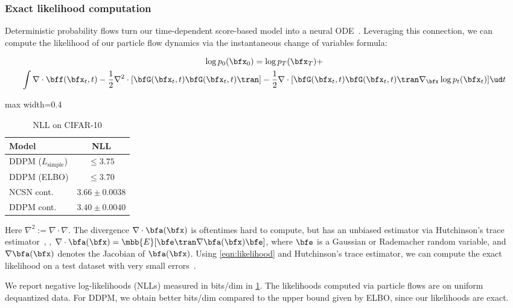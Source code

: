 \subsubsection{Exact likelihood computation}
Deterministic probability flows turn our time-dependent score-based model into a neural ODE~\citep{chen2018neural}. Leveraging this connection, we can compute the likelihood of our particle flow dynamics via the instantaneous change of variables formula:
\begin{theorem}
\begin{multline}
\log p_0(\bfx_0) = \log p_T(\bfx_T) + \\
\int \nabla \cdot \bff(\bfx_t, t) - \frac{1}{2} \nabla^2 \cdot [\bfG(\bfx_t, t)\bfG(\bfx_t, t)\tran] - \frac{1}{2} \nabla \cdot [\bfG(\bfx_t, t)\bfG(\bfx_t, t)\tran \nabla_\bfx \log p_t(\bfx_t)]  \ud t
\end{multline}\label{eqn:likelihood}
\end{theorem}
\begin{table}
\vspace{-2em}
\centering
\caption{NLL on CIFAR-10}\label{tab:bpd}
\begin{adjustbox}{max width=0.4\textwidth}
    \begin{tabular}{l c}
    \toprule
    Model & NLL \\
    \midrule
    DDPM ($L_{\text{simple}}$) & $\leq 3.75$\\
    DDPM (ELBO) & $\leq 3.70$\\
    \midrule
    NCSN cont. & $3.66 \pm 0.0038$\\
    DDPM cont. & $3.40 \pm 0.0040$\\
    \bottomrule
    \end{tabular}
\end{adjustbox}
\end{table}
Here $\nabla^2 := \nabla \cdot \nabla$. The divergence $\nabla \cdot \bfa(\bfx)$ is oftentimes hard to compute, but has an unbiased estimator via Hutchinson's trace estimator~\citep{hutchinson1990stochastic}, \ie, $\nabla \cdot \bfa(\bfx) = \mbb{E}[\bfe \tran \nabla \bfa(\bfx) \bfe]$, where $\bfe$ is a Gaussian or Rademacher random variable, and $\nabla \bfa(\bfx)$ denotes the Jacobian of $\bfa(\bfx)$. Using \cref{eqn:likelihood} and Hutchinson's trace estimator, we can compute the exact likelihood on a test dataset with very small errors~\citep{grathwohl2019scalable}.

We report negative log-likelihoods (NLLs) measured in bits/dim in \cref{tab:bpd}. The likelihoods computed via particle flows are on uniform dequantized data. For DDPM, we obtain better bits/dim compared to the upper bound given by ELBO, since our likelihoods are exact.

